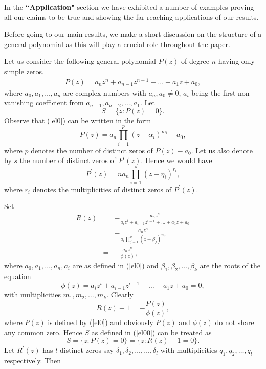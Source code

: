 \documentclass[a4paper,draft]{amsproc}
\theoremstyle{plain}
\theoremstyle{definition}
\theoremstyle{remark}
\newcommand{\be}{\begin{equation}}
\newcommand{\ee}{\end{equation}}
\newcommand{\bea}{\begin{eqnarray}}
\newcommand{\eea}{\end{eqnarray}}
\renewcommand{\d}{\displaystyle}
\numberwithin{equation}{section}
\begin{document}
\vspace{0.1in}\par In the {\bf ``Application"} section we have  exhibited a number of examples proving all our claims to be true and showing the far reaching applications of our  results.%
\par Before going to our main results, we make a short discussion on the structure of a general
polynomial as this will play a crucial role throughout the paper. 
\vspace{0.1in}\par Let us consider the following general polynomial $P(z)$ of degree $n$ having only simple zeros.  	\bea\label{el0} P(z)=a_nz^n+a_{n-1}z^{n-1}+\ldots+a_1z+a_0,\eea
where $ a_0,a_1,\dots,a_n$ are  complex numbers with $a_n,a_0\neq 0$, $a_{i}$ being the first non-vanishing coefficient  from $a_{n-1}, a_{n-2},\ldots,a_{1}$. Let \be\label{el00}S=\{z:P(z)=0\}.\ee
Observe that (\ref{el0}) can be written in the form \be\label{el000}P(z)=a_{n}\prod\limits_{i=1}^{p}(z-\alpha_{i})^{m_{i}}+a_{0},\ee where $p$ denotes the   number of distinct zeros of $P(z)-a_{0}$. Let us also denote by $s$ the number of distinct zeros of $P^{'}(z)$. Hence we would have 
\be\label{el0000}P^{'}(z)=na_{n}\prod\limits_{i=1}^{s}(z-\eta_{i})^{r_{i}},\ee where $r_{i}$ denotes the multiplicities of distinct zeros of $P^{'}(z)$.
\vspace{0.2in}\par 	
Set 
\bea\label{el2} R(z)&=& -\frac{a_nz^n}{a_iz^i+a_{i-1}z^{i-1}+\ldots+a_1z+a_0}\\\nonumber&=&- \frac{a_{n}z^n}{a_{i}\prod\limits_{j=1}^{k}(z-\beta_j)^{m_{j}}}\\\nonumber&=&\d-\frac{a_{n}z^{n}}{\phi(z)},\eea
where $a_{0},a_{1},\ldots,a_{n}, a_{i}$ are as defined in (\ref{el0}) and $\beta_1,\beta_2,\ldots,\beta_k$ are the roots of the equation $$\phi(z)=a_iz^i+a_{i-1}z^{i-1}+\ldots+a_1z+a_0=0,$$ with multiplicities $m_1,m_2,\ldots,m_k$. Clearly \be\nonumber R(z)-1=\d-\frac{P(z)}{\phi(z)},\ee where $P(z)$ is defined by (\ref{el0}) and obviously $P(z)$ and $\phi(z)$ do not share any common zero. Hence $S$ as defined in (\ref{el00}) can be treated as \be\label{el02}S=\{z:P(z)=0\}=\{z:R(z)-1=0\}.\ee  Let $R^{'}(z)$ has $l$ distinct zeros say $\delta_{1},\delta_{2},\ldots,\ldots,
\delta_{l}$ with multiplicities $q_{1},q_{2},\ldots,q_{l}$ respectively. Then  
\end{document}
